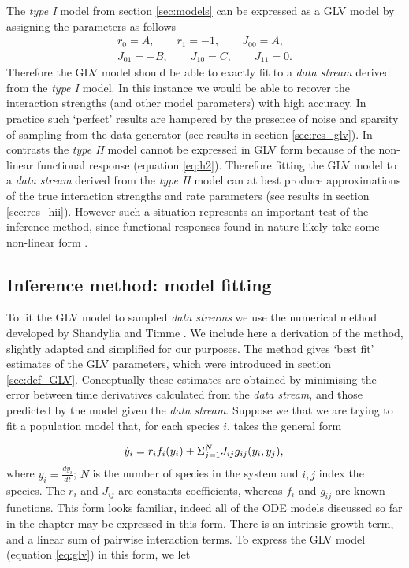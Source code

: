 The \emph{type I} model from section \ref{sec:models} can be expressed as a GLV model by assigning the parameters as follows
\begin{eqnarray}
r_0 = A, \qquad r_1 = -1, \qquad J_{00} = A, \\[10pt]
J_{01} = -B, \qquad J_{10} = C, \qquad J_{11} = 0.
\end{eqnarray}
%
Therefore the GLV model should be able to exactly fit to a \emph{data stream} derived from the \emph{type I} model. In this instance we would be able to recover the interaction strengths (and other model parameters) with high accuracy. In practice such `perfect' results are hampered by the presence of noise and sparsity of sampling from the data generator (see results in section \ref{sec:res_glv}). In contrasts the \emph{type II} model cannot be expressed in GLV form because of the non-linear functional response (equation \eqref{eq:h2}). Therefore fitting the GLV model to a \emph{data stream} derived from the \emph{type II} model can at best produce approximations of the true interaction strengths and rate parameters (see results in section \ref{sec:res_hii}). However such a situation represents an important test of the inference method, since functional responses found in nature likely take some non-linear form \cite{arditi2012species}.  
 
\subsection{Inference method: model fitting}
\label{sec:timme}


To fit the GLV model to sampled \emph{data streams} we use the numerical method developed by Shandylia and Timme \cite{shandilya2011inferring}. We include here a derivation of the method, slightly adapted and simplified for our purposes. The method gives `best fit' estimates of the GLV parameters, which were introduced in section \ref{sec:def_GLV}. Conceptually these estimates are obtained by minimising the error between time derivatives calculated from the \emph{data stream}, and those predicted by the model given the \emph{data stream}. Suppose we that we are trying to fit a population model that, for each species $i$, takes the general form

\begin{equation}\label{eq:timme1}
 \dot{y}_i = r_if_i(y_i) + \Sigma_{j=1}^{N}J_{ij}g_{ij}(y_i,y_j),\\
\end{equation}
%
where $\dot{y}_i = \frac{dy_{i}}{dt}$; $N$ is the number of species in the system and $i,j$ index the species. The $r_i$ and $J_{ij}$ are constants coefficients, whereas $f_i$ and $g_{ij}$ are known functions. This form looks familiar, indeed all of the ODE models discussed so far in the chapter may be expressed in this form. There is an intrinsic growth term, and a linear sum of pairwise interaction terms. To express the GLV model (equation \ref{eq:glv}) in this form, we let


